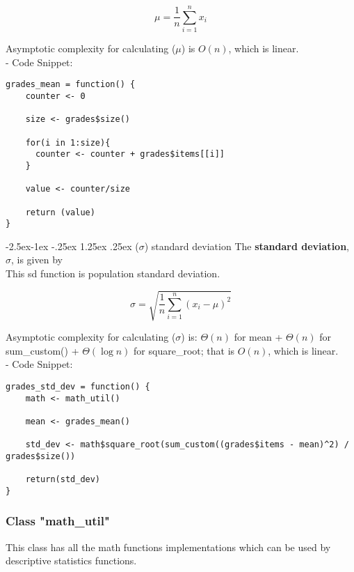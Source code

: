 \documentclass[11pt]{article}
\makeatletter
\renewcommand\paragraph{\@startsection{paragraph}{4}{\z@}%
            {-2.5ex\@plus -1ex \@minus -.25ex}%
            {1.25ex \@plus .25ex}%
            {\normalfont\normalsize\bfseries}}
\makeatother
\begin{document}
$$\mu = \frac{1}{n}\sum_{i=1}^{n} x_i$$

Asymptotic complexity for calculating ($\mu$) is $O(n)$, which is linear.\\

- Code Snippet:\\

\begin{lstlisting}
grades_mean = function() {
    counter <- 0

    size <- grades$size()

    for(i in 1:size){
      counter <- counter + grades$items[[i]]
    }

    value <- counter/size

    return (value)
}
\end{lstlisting}

\paragraph{($\sigma$) standard deviation}
The \textbf{standard deviation}, $\sigma$, is given by\\

This \gls{sd} function is population standard deviation.

$$\sigma = \sqrt{\frac{1}{n}\sum_{i=1}^{n} (x_i - \mu)^2}$$

Asymptotic complexity for calculating ($\sigma$) is: $\Theta(n)$ for mean + $\Theta(n)$ for sum\_custom() + $\Theta(\log{n})$ for square\_root; that is $O(n)$, which is linear.\\

- Code Snippet:\\

\begin{lstlisting}
grades_std_dev = function() {
    math <- math_util()

    mean <- grades_mean()

    std_dev <- math$square_root(sum_custom((grades$items - mean)^2) / grades$size())
	  
    return(std_dev)
}
\end{lstlisting}

\subsubsection{Class "math\_util"}

This class has all the math functions implementations which can be used by descriptive statistics functions.\\
\end{document}
